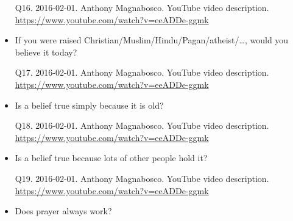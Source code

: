 \documentclass[a4paper]{scrartcl}
\begin{document}
\begin{itemize}
                \begin{tiny}
                    Q16.
                    2016-02-01.
                    Anthony Magnabosco.
                        YouTube video description.
                        \\
                        \url{ https://www.youtube.com/watch?v=eeADDe-ggmk }
                    \par
                \end{tiny}
                    \item If you were raised Christian\slash Muslim\slash Hindu\slash Pagan\slash atheist\slash \dots, would you believe it today?
                    
                \begin{tiny}
                    Q17.
                    2016-02-01.
                    Anthony Magnabosco.
                        YouTube video description.
                        \\
                        \url{ https://www.youtube.com/watch?v=eeADDe-ggmk }
                    \par
                \end{tiny}
                    \item Is a belief true simply because it is old?
                    
                \begin{tiny}
                    Q18.
                    2016-02-01.
                    Anthony Magnabosco.
                        YouTube video description.
                        \\
                        \url{ https://www.youtube.com/watch?v=eeADDe-ggmk }
                    \par
                \end{tiny}
                    \item Is a belief true because lots of other people hold it?
                    
                \begin{tiny}
                    Q19.
                    2016-02-01.
                    Anthony Magnabosco.
                        YouTube video description.
                        \\
                        \url{ https://www.youtube.com/watch?v=eeADDe-ggmk }
                    \par
                \end{tiny}
                    \item Does prayer always work?
                    

\end{itemize}
\end{document}
